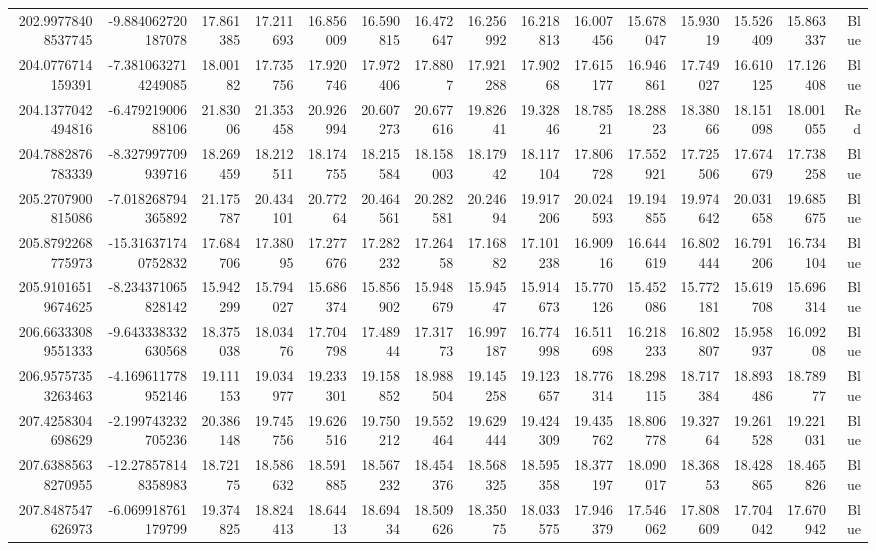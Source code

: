 \begin{center}
\begin{longtable}{rrrrrrrrrrrrrrr}
202.99778408537745 & -9.884062720187078 & 17.861385 & 17.211693 & 16.856009 & 16.590815 & 16.472647 & 16.256992 & 16.218813 & 16.007456 & 15.678047 & 15.93019 & 15.526409 & 15.863337 & Blue \\
204.0776714159391 & -7.3810632714249085 & 18.00182 & 17.735756 & 17.920746 & 17.972406 & 17.8807 & 17.921288 & 17.90268 & 17.615177 & 16.946861 & 17.749027 & 16.610125 & 17.126408 & Blue \\
204.1377042494816 & -6.47921900688106 & 21.83006 & 21.353458 & 20.926994 & 20.607273 & 20.677616 & 19.82641 & 19.32846 & 18.78521 & 18.28823 & 18.38066 & 18.151098 & 18.001055 & Red \\
204.7882876783339 & -8.327997709939716 & 18.269459 & 18.212511 & 18.174755 & 18.215584 & 18.158003 & 18.17942 & 18.117104 & 17.806728 & 17.552921 & 17.725506 & 17.674679 & 17.738258 & Blue \\
205.2707900815086 & -7.018268794365892 & 21.175787 & 20.434101 & 20.77264 & 20.464561 & 20.282581 & 20.24694 & 19.917206 & 20.024593 & 19.194855 & 19.974642 & 20.031658 & 19.685675 & Blue \\
205.8792268775973 & -15.316371740752832 & 17.684706 & 17.38095 & 17.277676 & 17.282232 & 17.26458 & 17.16882 & 17.101238 & 16.90916 & 16.644619 & 16.802444 & 16.791206 & 16.734104 & Blue \\
205.91016519674625 & -8.234371065828142 & 15.942299 & 15.794027 & 15.686374 & 15.856902 & 15.948679 & 15.94547 & 15.914673 & 15.770126 & 15.452086 & 15.772181 & 15.619708 & 15.696314 & Blue \\
206.66333089551333 & -9.643338332630568 & 18.375038 & 18.03476 & 17.704798 & 17.48944 & 17.31773 & 16.997187 & 16.774998 & 16.511698 & 16.218233 & 16.802807 & 15.958937 & 16.09208 & Blue \\
206.95757353263463 & -4.169611778952146 & 19.111153 & 19.034977 & 19.233301 & 19.158852 & 18.988504 & 19.145258 & 19.123657 & 18.776314 & 18.298115 & 18.717384 & 18.893486 & 18.78977 & Blue \\
207.4258304698629 & -2.199743232705236 & 20.386148 & 19.745756 & 19.626516 & 19.750212 & 19.552464 & 19.629444 & 19.424309 & 19.435762 & 18.806778 & 19.32764 & 19.261528 & 19.221031 & Blue \\
207.63885638270955 & -12.278578148358983 & 18.72175 & 18.586632 & 18.591885 & 18.567232 & 18.454376 & 18.568325 & 18.595358 & 18.377197 & 18.090017 & 18.36853 & 18.428865 & 18.465826 & Blue \\
207.8487547626973 & -6.069918761179799 & 19.374825 & 18.824413 & 18.64413 & 18.69434 & 18.509626 & 18.35075 & 18.033575 & 17.946379 & 17.546062 & 17.808609 & 17.704042 & 17.670942 & Blue \\

\end{longtable}
\end{center}
